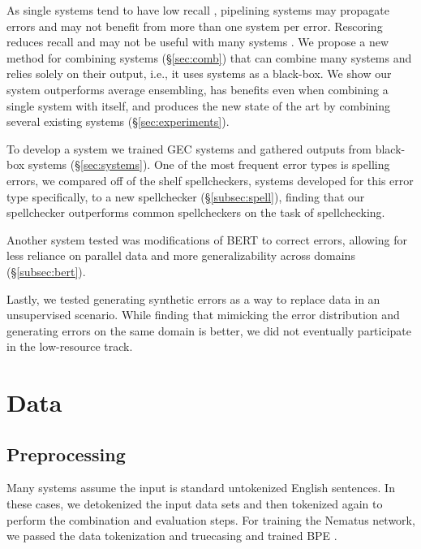 \documentclass[11pt,a4paper]{article}
\begin{document}
As single systems tend to have low recall \cite{choshen2018inherent}, pipelining systems may propagate errors and may not benefit from more than one system per error. Rescoring reduces recall and may not be useful with many systems \cite{grundkiewicz2018near}.  We propose a new method for combining systems (\S \ref{sec:comb}) that can combine many systems and relies solely on their output, i.e., it uses systems as a black-box. We show our system outperforms average ensembling, has benefits even when combining a single system with itself, and produces the new state of the art by combining several existing systems (\S \ref{sec:experiments}).

To develop a system we trained GEC systems and gathered outputs from black-box systems (\S \ref{sec:systems}). One of the most frequent error types is spelling errors, we compared off of the shelf spellcheckers, systems developed for this error type specifically, to a new spellchecker (\S \ref{subsec:spell}), finding that our spellchecker outperforms common spellcheckers on the task of spellchecking.

Another system tested was modifications of BERT \cite{devlin2018bert} to correct errors, allowing for less reliance on parallel data and more generalizability across domains (\S \ref{subsec:bert}). 

Lastly, we tested generating synthetic errors \cite{felice2014generating} as a way to replace data in an unsupervised scenario. While finding that mimicking the error distribution and generating errors on the same domain is better, we did not eventually participate in the low-resource track.


  \section{Data}
\subsection{Preprocessing}
Many systems assume the input is standard untokenized English sentences. In these cases, we detokenized the input data sets and then tokenized again to perform the combination and evaluation steps.  For training the Nematus network, we passed the data tokenization and truecasing \cite{koehn2007moses} and trained BPE \cite{sennrich2015neural}.
\end{document}
